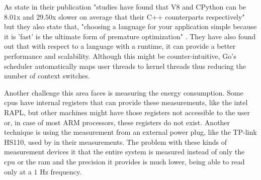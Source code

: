 As \textcite{usenix-comparing-29x} state in their publication "studies have found that \gls{V8} and \gls{CPython} can be $8.01$x and $29.50$x slower on average that their C++ counterparts respectively" but they also state that, "choosing a language for your application simple because it is 'fast' is the ultimate form of premature optimization" \cite{python-is-slow}. They have also found out that with respect to a language with a runtime, it can provide a better performance and scalability. Although this might be counter-intuitive, Go's scheduler automatically maps user threads to kernel threads thus reducing the number of context switches.

Another challenge this area faces is measuring the energy consumption. Some \glspl{cpu} have internal registers that can provide these measurements, like the intel RAPL, but other machines might have those registers not accessible to the user or, in case of most ARM processors, these registers do not exist. Another technique is using the measurement from an external power plug, like the TP-link HS110, used by \textcite{meassuring-jit} in their measurements. The problem with these kinds of measurement devices it that the entire system is measured instead of only the \gls{cpu} or the \gls{ram} and the precision it provides is much lower, being able to read only at a $1$ Hz frequency. 

